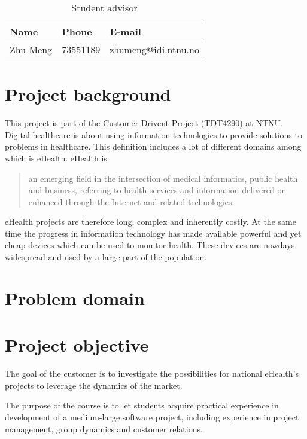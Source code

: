 \begin{table}
\begin{center}
\begin{tabular}{ l | l | l }
  \hline
  Name & Phone & E-mail \\
  \hline\noalign{\smallskip}\noalign{\smallskip}\hline
  Zhu Meng	& 73551189 & zhumeng@idi.ntnu.no \\
  \hline
\end{tabular}
\end{center}
\caption{Student advisor}
\label{table:advisor}
\end{table}


\newpage
\section{Project background}

This project is part of the Customer Drivent Project (TDT4290) at NTNU.
Digital healthcare is about using information technologies to provide solutions to problems in healthcare. This definition includes a lot of different domains among which is eHealth. eHealth is
\begin{quote}
an emerging field in the intersection of medical informatics, public health and business, referring to health services and information delivered or enhanced through the Internet and related technologies.\citep{ehealth}
\end{quote}
eHealth projects are therefore long, complex and inherently costly. At the same time the progress in information technology has made available powerful and yet cheap devices which can be used to monitor health. These devices are nowdays widespread and used by a large part of the population.


\section{Problem domain}

\section{Project objective}

The goal of the customer is to investigate the possibilities for national eHealth's projects to leverage the dynamics of the market.

The purpose of the course is to let students acquire practical experience in development of a medium-large software project,
including experience in project management, group dynamics and customer relations.

